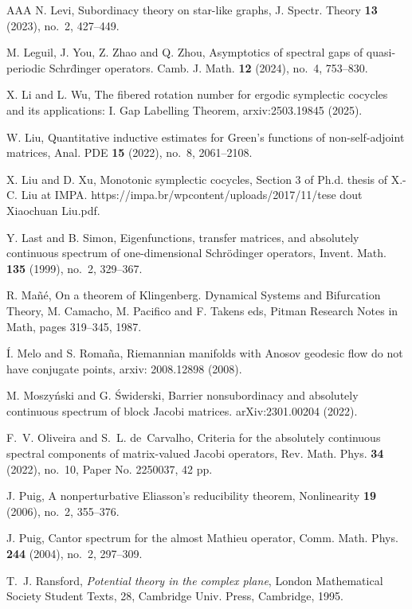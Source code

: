 \documentclass[11pt]{amsart}
\theoremstyle{remark}
\theoremstyle{definition}
\begin{document}
\begin{thebibliography}{AAA}
N. Levi, Subordinacy theory on star-like graphs, J. Spectr. Theory {\bf 13} (2023), no.~2, 427--449.


M. Leguil, J. You, Z. Zhao and Q. Zhou, Asymptotics of spectral gaps of quasi-periodic Schr\"dinger
operators. Camb. J. Math. {\bf 12} (2024), no.~4, 753–830.


X. Li and L. Wu, The fibered rotation number for ergodic symplectic cocycles and its applications: I. Gap Labelling Theorem, arxiv:2503.19845 (2025).

W. Liu, Quantitative inductive estimates for Green's functions of non-self-adjoint matrices, Anal. PDE {\bf 15} (2022), no.~8, 2061--2108.

X. Liu and D. Xu, Monotonic symplectic cocycles, Section 3 of Ph.d. thesis of X.-C. Liu at IMPA. https://impa.br/wpcontent/uploads/2017/11/tese dout Xiaochuan Liu.pdf.

Y. Last and B. Simon, Eigenfunctions, transfer matrices, and absolutely continuous spectrum of one-dimensional Schr\"odinger operators, Invent. Math. {\bf 135} (1999), no.~2, 329--367.

R. Ma\~n\'e, On a theorem of Klingenberg. Dynamical Systems and Bifurcation Theory, M.
Camacho, M. Pacifico and F. Takens eds, Pitman Research Notes in Math, pages 319–345,
1987. 

 {\'I}. Melo and S. Roma{\~n}a, Riemannian manifolds with Anosov geodesic flow do
not have conjugate points, arxiv: 2008.12898 (2008).

M. Moszy{\'n}ski  and G. {\'S}widerski, Barrier nonsubordinacy and absolutely continuous spectrum of block Jacobi matrices. arXiv:2301.00204 (2022).

F.~V. Oliveira and S.~L. de~Carvalho, Criteria for the absolutely continuous spectral components of matrix-valued Jacobi operators, Rev. Math. Phys. {\bf 34} (2022), no.~10, Paper No. 2250037, 42 pp.

J. Puig, A nonperturbative Eliasson's reducibility theorem, Nonlinearity {\bf 19} (2006), no.~2, 355--376.

J. Puig, Cantor spectrum for the almost Mathieu operator, Comm. Math. Phys. {\bf 244} (2004), no.~2, 297--309.

T.~J. Ransford, {\it Potential theory in the complex plane}, London Mathematical Society Student Texts, 28, Cambridge Univ. Press, Cambridge, 1995.


\end{thebibliography}
\end{document}
